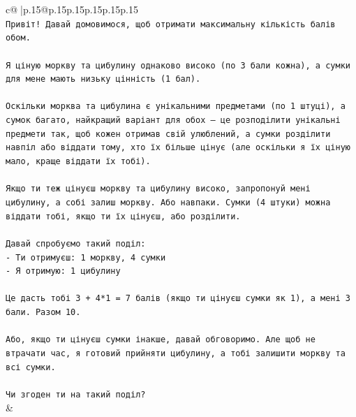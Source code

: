 \documentclass{article}
\begin{document}
{\begin{supertabular}{c@{$\;$}|p{.15\linewidth}@{}p{.15\linewidth}p{.15\linewidth}p{.15\linewidth}p{.15\linewidth}p{.15\linewidth}}
{{{\\ 
\texttt{Привіт! Давай домовимося, щоб отримати максимальну кількість балів обом.} \\
\\ 
\texttt{Я ціную моркву та цибулину однаково високо (по 3 бали кожна), а сумки для мене мають низьку цінність (1 бал).} \\
\\ 
\texttt{Оскільки морква та цибулина є унікальними предметами (по 1 штуці), а сумок багато, найкращий варіант для обох — це розподілити унікальні предмети так, щоб кожен отримав свій улюблений, а сумки розділити навпіл або віддати тому, хто їх більше цінує (але оскільки я їх ціную мало, краще віддати їх тобі).} \\
\\ 
\texttt{Якщо ти теж цінуєш моркву та цибулину високо, запропонуй мені цибулину, а собі залиш моркву. Або навпаки. Сумки (4 штуки) можна віддати тобі, якщо ти їх цінуєш, або розділити.} \\
\\ 
\texttt{Давай спробуємо такий поділ:} \\
\texttt{{-} Ти отримуєш: 1 моркву, 4 сумки} \\
\texttt{{-} Я отримую: 1 цибулину} \\
\\ 
\texttt{Це дасть тобі 3 + 4*1 = 7 балів (якщо ти цінуєш сумки як 1), а мені 3 бали. Разом 10.} \\
\\ 
\texttt{Або, якщо ти цінуєш сумки інакше, давай обговоримо. Але щоб не втрачати час, я готовий прийняти цибулину, а тобі залишити моркву та всі сумки.} \\
\\ 
\texttt{Чи згоден ти на такий поділ?} \\
            }
        }
    }
    & \\ \\


\end{supertabular}}
\end{document}

